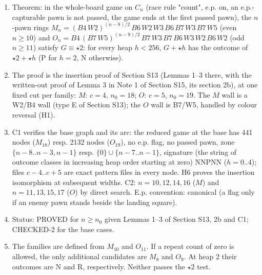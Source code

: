 \begin{enumerate}
\item Theorem: in the whole-board game on $C_n$ (race rule "count", e.p. on, an e.p.-capturable pawn is not passed, the game ends at the first passed pawn), the $n$-pawn rings $M_n = (B4\,W2)^{(n-8)/2}\,B6\,W2\,W3\,B6\,B7\,W3\,B7\,W5$ (even $n\ge10$) and $O_n = B4\,(B7\,W5)^{(n-9)/2}\,B7\,W3\,B7\,B6\,W3\,W2\,B6\,W2$ (odd $n\ge11$) satisfy $G\equiv\star2$: for every heap $h<256$, $G+\star h$ has the outcome of $\star2+\star h$ (P for $h=2$, N otherwise).
\item The proof is the insertion proof of Section S13 (Lemmas 1–3 there, with the written-out proof of Lemma 3 in Note 1 of Section S15, its section 2b), at one fixed cut per family: $M$: $c=4$, $n_0=18$; $O$: $c=5$, $n_0=19$. The $M$ wall is a W2/B4 wall (type E of Section S13); the $O$ wall is B7/W5, handled by colour reversal (H1).
\item C1 verifies the base graph and its arc: the reduced game at the base has 441 nodes ($M_{18}$) resp. 2132 nodes ($O_{19}$), no e.p. flag, no passed pawn, zone $\{n-8..n-3,n-1\}$ resp. $\{0\}\cup\{n-7..n-1\}$, signature (the string of outcome classes in increasing heap order starting at zero) NNPNN ($h=0..4$); files $c-4..c+5$ are exact pattern files in every node. H6 proves the insertion isomorphism at subsequent widths. C2: $n=10,12,14,16$ ($M$) and $n=11,13,15,17$ ($O$) by direct search. E.p. convention: canonical (a flag only if an enemy pawn stands beside the landing square).
\item Status: PROVED for $n\ge n_0$ given Lemmas 1–3 of Section S13, 2b and C1; CHECKED-2 for the base cases.
\item The families are defined from $M_{10}$ and $O_{11}$. If a repeat count of zero is allowed, the only additional candidates are $M_8$ and $O_9$. At heap 2 their outcomes are N and R, respectively. Neither passes the $\star2$ test.
\end{enumerate}
